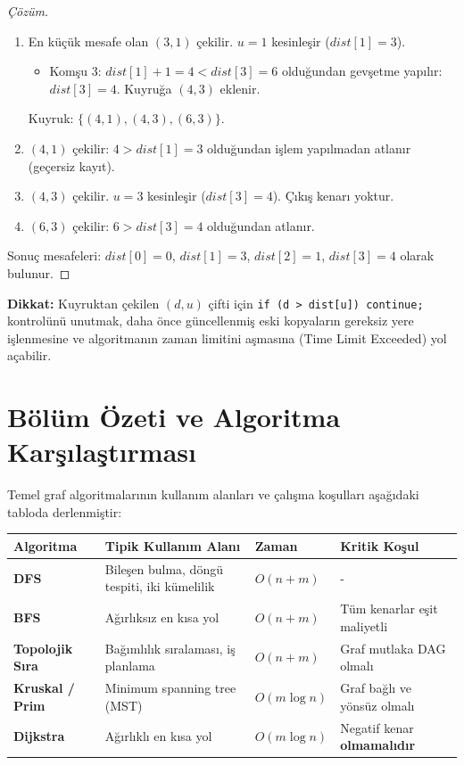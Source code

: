 \begin{example}
\begin{proof}[Çözüm]
\begin{enumerate}
    \item En küçük mesafe olan $(3, 1)$ çekilir. $u = 1$ kesinleşir ($dist[1] = 3$).
    \begin{itemize}
        \item Komşu 3: $dist[1] + 1 = 4 < dist[3]=6$ olduğundan gevşetme yapılır: $dist[3] = 4$. Kuyruğa $(4, 3)$ eklenir.
    \end{itemize}
    Kuyruk: $\{(4, 1), (4, 3), (6, 3)\}$.

    \item $(4, 1)$ çekilir: $4 > dist[1]=3$ olduğundan işlem yapılmadan atlanır (geçersiz kayıt).
    \item $(4, 3)$ çekilir. $u = 3$ kesinleşir ($dist[3] = 4$). Çıkış kenarı yoktur.
    \item $(6, 3)$ çekilir: $6 > dist[3]=4$ olduğundan atlanır.
\end{enumerate}

Sonuç mesafeleri: $dist[0] = 0$, $dist[1] = 3$, $dist[2] = 1$, $dist[3] = 4$ olarak bulunur.
\end{proof}
\end{example}

\textbf{Dikkat:} Kuyruktan çekilen $(d,u)$ çifti için \linebreak[4]\texttt{if (d > dist[u]) continue;} kontrolünü unutmak, daha önce güncellenmiş eski kopyaların gereksiz yere işlenmesine ve algoritmanın zaman limitini aşmasına (Time Limit Exceeded) yol açabilir.

\section{Bölüm Özeti ve Algoritma Karşılaştırması}

Temel graf algoritmalarının kullanım alanları ve çalışma koşulları aşağıdaki tabloda derlenmiştir:

\begin{center}
\begin{tabular}{|l|p{3.2cm}|p{1.8cm}|p{2.8cm}|}
\hline
\textbf{Algoritma} & \textbf{Tipik Kullanım Alanı} & \textbf{Zaman} & \textbf{Kritik Koşul} \\ \hline
\textbf{DFS} & Bileşen bulma, döngü tespiti, iki kümelilik & $O(n + m)$ & - \\ \hline
\textbf{BFS} & Ağırlıksız en kısa yol & $O(n + m)$ & Tüm kenarlar eşit maliyetli \\ \hline
\textbf{Topolojik Sıra} & Bağımlılık sıralaması, iş planlama & $O(n + m)$ & Graf mutlaka DAG olmalı \\ \hline
\textbf{Kruskal / Prim} & Minimum spanning tree (MST) & $O(m \log n)$ & Graf bağlı ve yönsüz olmalı \\ \hline
\textbf{Dijkstra} & Ağırlıklı en kısa yol & $O(m \log n)$ & Negatif kenar \textbf{olmamalıdır} \\ \hline
\end{tabular}
\end{center}

